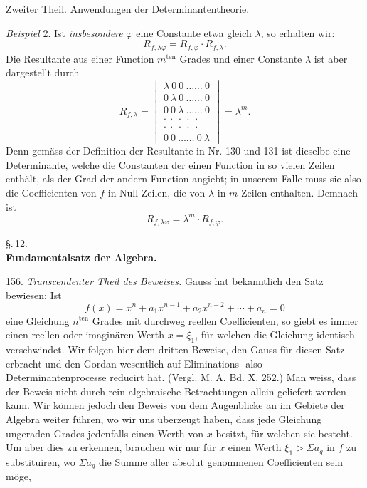 \documentclass[11pt]{article}
\providecommand{\weberpage}[1]{}
\let\Sigma\varSigma
\begin{document}
\weberpage{166}
Zweiter Theil. Anwendungen der Determinantentheorie.

\textit{Beispiel} 2. Ist \textit{insbesondere} $\varphi$ eine Constante etwa gleich $\lambda$, so erhalten wir:
\[
R_{f,\lambda\varphi} = R_{f,\varphi}\cdot R_{f,\lambda}.
\]
Die Resultante aus einer Function $m^{\text{ten}}$ Grades und einer Constante $\lambda$ ist aber dargestellt durch
\[
R_{f,\lambda} =
\begin{vmatrix}
\lambda\ 0\ 0\ \ldots\ldots\ 0\\
0\ \lambda\ 0\ \ldots\ldots\ 0\\
0\ 0\ \lambda\ \ldots\ldots\ 0\\
\cdot\ \cdot\ \cdot\ \cdot\ \cdot\\
\cdot\ \cdot\ \cdot\ \cdot\ \cdot\\
0\ 0\ \ldots\ldots\ 0\ \lambda
\end{vmatrix}
= \lambda^m.
\]
Denn gem\"ass der Definition der Resultante in Nr. 130 und 131 ist dieselbe eine Determinante, welche die Constanten der einen Function in so vielen Zeilen enth\"alt, als der Grad der andern Function angiebt; in unserem Falle muss sie also die Coefficienten von $f$ in Null Zeilen, die von $\lambda$ in $m$ Zeilen enthalten. Demnach ist
\[
R_{f,\lambda\varphi} = \lambda^m\cdot R_{f,\varphi}.
\]

\begin{center}
\S.\,12.\\
\textbf{Fundamentalsatz der Algebra.}
\end{center}

156. \textit{Transcendenter Theil des Beweises.} Gauss hat bekanntlich den Satz bewiesen: \glqq Ist
\[
f(x) = x^n + a_1x^{n-1} + a_2x^{n-2} + \cdots + a_n = 0
\]
eine Gleichung $n^{\text{ten}}$ Grades mit durchweg reellen Coefficienten, so giebt es immer einen reellen oder imagin\"aren Werth $x=\xi_1$, f\"ur welchen die Gleichung identisch verschwindet.\grqq{}
Wir folgen hier dem dritten Beweise, den Gauss f\"ur diesen Satz erbracht und den Gordan wesentlich auf Eliminations- also Determinantenprocesse reducirt hat. (Vergl. M. A. Bd. X. 252.) Man weiss, dass der Beweis nicht durch rein algebraische Betrachtungen allein geliefert werden kann. Wir k\"onnen jedoch den Beweis von dem Augenblicke an im Gebiete der Algebra weiter f\"uhren, wo wir uns \"uberzeugt haben, dass jede Gleichung ungeraden Grades jedenfalls einen Werth von $x$ besitzt, f\"ur welchen sie besteht. Um aber dies zu erkennen, brauchen wir nur f\"ur $x$ einen Werth $\xi_1 > \Sigma a_g$ in $f$ zu substituiren, wo $\Sigma a_g$ die Summe aller absolut genommenen Coefficienten sein m\"oge,
\end{document}
